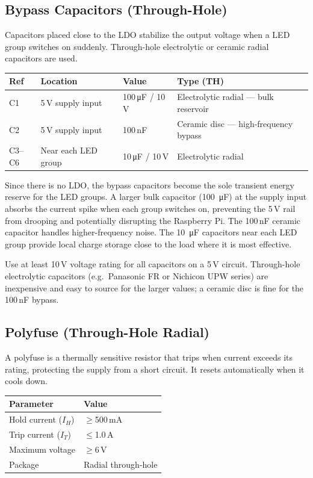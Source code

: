 \documentclass[12pt,letterpaper]{article}
\begin{document}
\subsection{Bypass Capacitors (Through-Hole)}

Capacitors placed close to the LDO stabilize the output voltage when a LED group
switches on suddenly. Through-hole electrolytic or ceramic radial capacitors are used.

\begin{center}
\begin{tabular}{llll}
\toprule
\textbf{Ref} & \textbf{Location} & \textbf{Value} & \textbf{Type (TH)} \\
\midrule
C1 & 5\,V supply input & 100\,\si{\micro F} / 10\,V & Electrolytic radial --- bulk reservoir \\
C2 & 5\,V supply input & 100\,nF & Ceramic disc --- high-frequency bypass \\
C3--C6 & Near each LED group & 10\,\si{\micro F} / 10\,V & Electrolytic radial \\
\bottomrule
\end{tabular}
\end{center}

Since there is no LDO, the bypass capacitors become the sole transient energy reserve
for the LED groups. A larger bulk capacitor (100~\si{\micro F}) at the supply input
absorbs the current spike when each group switches on, preventing the 5\,V rail from
drooping and potentially disrupting the Raspberry Pi. The 100\,nF ceramic capacitor
handles higher-frequency noise. The 10~\si{\micro F} capacitors near each LED group
provide local charge storage close to the load where it is most effective.

Use at least 10\,V voltage rating for all capacitors on a 5\,V circuit.
Through-hole electrolytic capacitors (e.g.\ Panasonic FR or Nichicon UPW series) are
inexpensive and easy to source for the larger values; a ceramic disc is fine for the
100\,nF bypass.

\subsection{Polyfuse (Through-Hole Radial)}

A polyfuse is a thermally sensitive resistor that trips when current exceeds its rating,
protecting the supply from a short circuit. It resets automatically when it cools down.

\begin{center}
\begin{tabular}{ll}
\toprule
\textbf{Parameter} & \textbf{Value} \\
\midrule
Hold current ($I_H$) & $\geq$500\,mA \\
Trip current ($I_T$) & $\leq$1.0\,A \\
Maximum voltage & $\geq$6\,V \\
Package & Radial through-hole \\
\bottomrule
\end{tabular}
\end{center}
\end{document}
